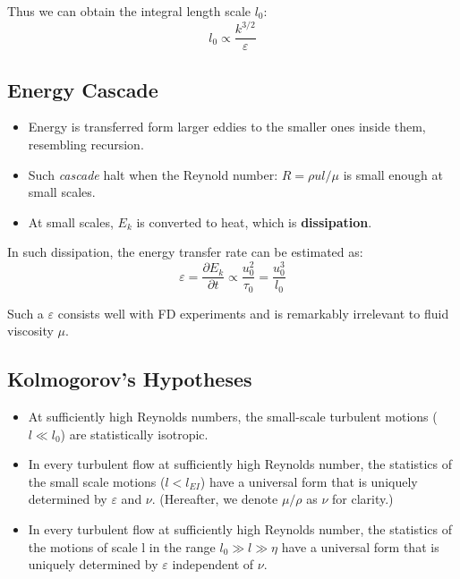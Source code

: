 \documentclass[12pt]{article}
\begin{document}
        Thus we can obtain the integral length scale $l_0$:
        \begin{equation}
            l_0 \propto \frac{k^{3/2}}{\varepsilon}
        \end{equation}
    \clearpage
    \subsection{Energy Cascade} %
    \label{sub:energy_cascade}
        \begin{itemize}
            \item Energy is transferred form larger eddies to the smaller ones inside them, resembling recursion.
            \item Such \emph{cascade} halt when the Reynold number: $R = \rho u l /\mu$ is small enough at small scales.
            \item At small scales, $E_k$ is converted to heat, which is \textbf{dissipation}.
        \end{itemize}
    In such dissipation, the energy transfer rate can be estimated as:
    \begin{equation}
        \varepsilon = \frac{\partial E_k}{\partial t} \propto \frac{u_0^2}{\tau_0}=\frac{u_0^3}{l_0}
    \end{equation}

    Such a $\varepsilon$ consists well with FD experiments and is remarkably irrelevant to fluid viscosity $\mu$. 
    \clearpage
    \subsection{Kolmogorov's Hypotheses} %
    \label{sub:kolmogorov_s_hypotheses}
    \begin{itemize}
        \item At sufficiently high Reynolds numbers, the small-scale turbulent motions 
    ($l \ll l_0$) are statistically isotropic.
        \item In every turbulent flow at sufficiently high Reynolds number, the statistics of the small scale motions ($l<l_{EI}$) have a universal form that is uniquely determined by $\varepsilon$ and $\nu$. (Hereafter, we denote $\mu/\rho$ as $\nu$ for clarity.)
        \item In every turbulent flow at sufficiently high Reynolds number, the statistics of the motions of scale l in the range $l_0 \gg l \gg \eta$ have a universal form that is uniquely determined by $\varepsilon$ independent of $\nu$.
    \end{itemize}
\end{document}
